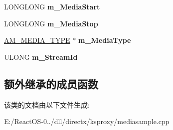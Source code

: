 \begin{DoxyCompactItemize}
L\+O\+N\+G\+L\+O\+NG {\bfseries m\+\_\+\+Media\+Start}
\item 
\mbox{\label{class_c_media_sample_ae96308a197fef45aea686de26b5d4e00}} 
L\+O\+N\+G\+L\+O\+NG {\bfseries m\+\_\+\+Media\+Stop}
\item 
\mbox{\label{class_c_media_sample_ab6afb372a60b1e56e2b067d489fecb2e}} 
\hyperlink{struct_a_m___m_e_d_i_a___t_y_p_e}{A\+M\+\_\+\+M\+E\+D\+I\+A\+\_\+\+T\+Y\+PE} $\ast$ {\bfseries m\+\_\+\+Media\+Type}
\item 
\mbox{\label{class_c_media_sample_a99e9cd370857f2f0bbae0a59d0a7600f}} 
U\+L\+O\+NG {\bfseries m\+\_\+\+Stream\+Id}
\end{DoxyCompactItemize}
\subsection*{额外继承的成员函数}


该类的文档由以下文件生成\+:\begin{DoxyCompactItemize}
\item 
E\+:/\+React\+O\+S-\/0../dll/directx/ksproxy/mediasample.\+cpp\end{DoxyCompactItemize}
